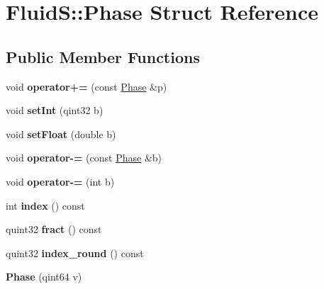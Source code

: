 \hypertarget{struct_fluid_s_1_1_phase}{}\section{FluidS\+:\+:Phase Struct Reference}
\label{struct_fluid_s_1_1_phase}
\subsection*{Public Member Functions}
\begin{DoxyCompactItemize}
\item 
\mbox{\label{struct_fluid_s_1_1_phase_ab12307a9a2e24f4fe7d89517af4bf14c}} 
void {\bfseries operator+=} (const \hyperlink{struct_fluid_s_1_1_phase}{Phase} \&p)
\item 
\mbox{\label{struct_fluid_s_1_1_phase_a69ad26f999efc349dca88b69bfd2c282}} 
void {\bfseries set\+Int} (qint32 b)
\item 
\mbox{\label{struct_fluid_s_1_1_phase_ab1ddc2339c462632524123c35ba0d463}} 
void {\bfseries set\+Float} (double b)
\item 
\mbox{\label{struct_fluid_s_1_1_phase_a641b86dcd5b692a189d574871fd9dbf1}} 
void {\bfseries operator-\/=} (const \hyperlink{struct_fluid_s_1_1_phase}{Phase} \&b)
\item 
\mbox{\label{struct_fluid_s_1_1_phase_ab8905b4f21f67589e88caabcef8c4bd5}} 
void {\bfseries operator-\/=} (int b)
\item 
\mbox{\label{struct_fluid_s_1_1_phase_a0ed48020e894f70607f7fcbe9476315f}} 
int {\bfseries index} () const
\item 
\mbox{\label{struct_fluid_s_1_1_phase_ab1a2663c8b1ea90ec67bd8456f5f9096}} 
quint32 {\bfseries fract} () const
\item 
\mbox{\label{struct_fluid_s_1_1_phase_ac8becddd5a29f1dbb7ed94c54577f350}} 
quint32 {\bfseries index\+\_\+round} () const
\item 
\mbox{\label{struct_fluid_s_1_1_phase_a21c336727b5eda978628c899ee855eff}} 
{\bfseries Phase} (qint64 v)
\end{DoxyCompactItemize}

